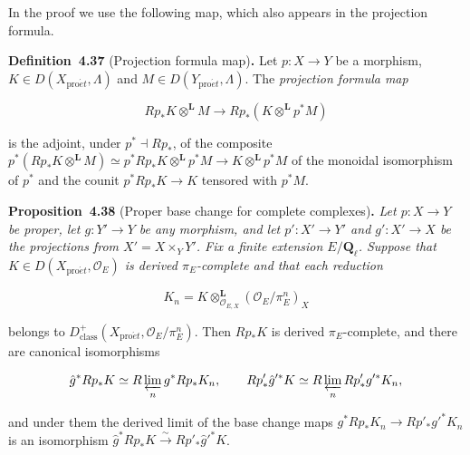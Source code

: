 \documentclass[11pt]{article}
\newenvironment{bpstatement}[2]{\par\addvspace{0.6\baselineskip}\noindent\textbf{#1}#2\textbf{.}\enspace\ignorespaces}
  {\par\addvspace{0.4\baselineskip}}
\newenvironment{bpstatementit}[2]{\begin{bpstatement}{#1}{#2}\itshape\ignorespaces}{\end{bpstatement}}
\begin{document}
In the proof we use the following map, which also appears in the projection formula.

\label{bp396}%
\begin{bpstatement}{Definition~4.37}{ (Projection formula map)}
Let \(p:X\to Y\) be a morphism, \(K\in D(X_{\mathrm{pro}\acute{e}t},\Lambda)\) and \(M\in D(Y_{\mathrm{pro}\acute{e}t},\Lambda)\). The \emph{projection formula map}

\[
Rp_*K\otimes^{\mathbf L}M\longrightarrow Rp_*(K\otimes^{\mathbf L}p^*M)
\tag{4.14}
\]

is the adjoint, under \(p^*\dashv Rp_*\), of the composite \(p^*(Rp_*K\otimes^{\mathbf L}M)\simeq p^*Rp_*K\otimes^{\mathbf L}p^*M
\to K\otimes^{\mathbf L}p^*M\) of the monoidal isomorphism of \(p^*\) and the counit \(p^*Rp_*K\to K\) tensored with \(p^*M\).
\end{bpstatement}

\label{bp397}%
\begin{bpstatementit}{Proposition~4.38}{ (Proper base change for complete complexes)}
Let \(p:X\to Y\) be proper, let \(g:Y'\to Y\) be any morphism, and let \(p':X'\to Y'\) and \(g':X'\to X\) be the projections from \(X'=X\times_YY'\). Fix a finite extension \(E/\mathbf Q_\ell\). Suppose that \(K\in D(X_{\mathrm{pro}\acute{e}t},\mathcal O_E)\) is derived \(\pi_E\)-complete and that each reduction

\[
K_n=K\otimes^{\mathbf L}_{\mathcal O_{E,X}}
(\mathcal O_E/\pi_E^n)_X
\]

belongs to \(D^+_{\mathrm{class}}(X_{\mathrm{pro}\acute{e}t},\mathcal O_E/\pi_E^n)\). Then \(Rp_*K\) is derived \(\pi_E\)-complete, and there are canonical isomorphisms

\[
\hat g^*Rp_*K\simeq R\varprojlim_n g^*Rp_*K_n,
\qquad
Rp'_*\hat g'^*K\simeq R\varprojlim_n Rp'_*g'^*K_n,
\]

and under them the derived limit of the base change maps \(g^*Rp_*K_n\to Rp'_*g'^*K_n\) is an isomorphism \(\hat g^*Rp_*K\xrightarrow{\ \sim\ }Rp'_*\hat g'^*K\).
\end{bpstatementit}
\end{document}
